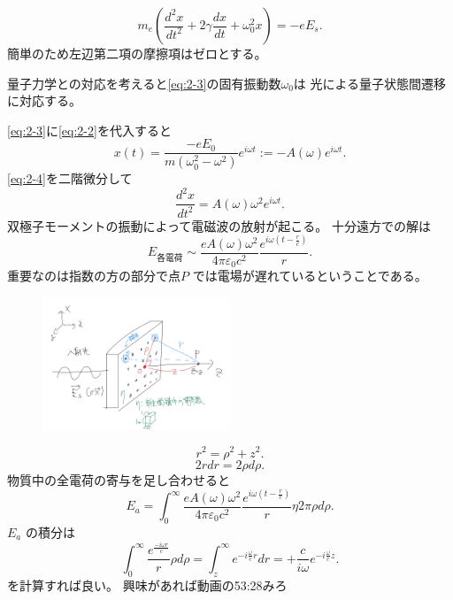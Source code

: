 \documentclass[dvipdfmx]{jsarticle}
\begin{document}
\begin{equation}
\label{eq:2-3}
m_e \left( \frac{d^2x}{dt^2}+2\gamma \frac{dx}{dt}+\omega_0^2x \right) =-eE_s
.\end{equation}
簡単のため左辺第二項の摩擦項はゼロとする。

量子力学との対応を考えると\eqref{eq:2-3}の固有振動数$\omega_0$は
光による量子状態間遷移に対応する。

\eqref{eq:2-3}に\eqref{eq:2-2}を代入すると
\begin{equation}
\label{eq:2-4}
	x(t)=\frac{-eE_0}{m(\omega_0^2-\omega^2)}e^{i\omega t}:=-A(\omega)e^{i\omega t}
.\end{equation}
\eqref{eq:2-4}を二階微分して
\begin{equation}
\label{eq:2-5}
	\frac{d^2x}{dt^2}=A(\omega)\omega^2e^{i\omega t}
.\end{equation}
双極子モーメントの振動によって電磁波の放射が起こる。
十分遠方での解は
\begin{equation}
\label{eq:2-6}
E_\text{各電荷} \sim \frac{eA(\omega)\omega^2}{4\pi\varepsilon_0c^2} \frac{e^{i\omega(t-\frac{r}{c})}}{r}
.\end{equation}
重要なのは指数の方の部分で点$P$ では電場が遅れているということである。
\begin{figure}[H]
	\centering
	\includegraphics[width=0.5\textwidth]{fig2/Fig-5.jpg}
	\label{fig:fig2-Fig-5-jpg}
\end{figure}
\[
r^2=\rho^2+z^2
.\] 
\[
2r dr=2\rho d\rho 
.\] 
物質中の全電荷の寄与を足し合わせると
\begin{equation}
\label{eq:2-7}
	E_a=\int_{0}^{\infty} \frac{eA(\omega)\omega^2}{4\pi\varepsilon_0c^2}\frac{e^{i\omega(t-\frac{r}{c})}}{r}\eta 2\pi \rho d\rho 
.\end{equation}
$E_a$ の積分は
\begin{equation}
\label{eq:2-8}
\int_{0}^{\infty} \frac{e^{\frac{-i\omega r}{c}}}{r}\rho d\rho = \int_{z}^{\infty} e^{-i \frac{\omega}{c}r}dr  =+\frac{c}{i\omega}e^{-i \frac{\omega}{c}z}
.\end{equation}
を計算すれば良い。
興味があれば動画の53:28みろ
\end{document}
